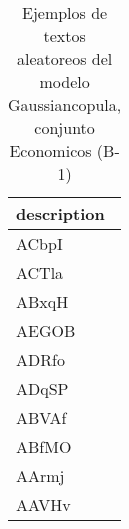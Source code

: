 \begin{table}[H]
\centering
\fontsize{8}{14}\selectfont
\caption{Ejemplos de textos aleatoreos del modelo Gaussiancopula, conjunto Economicos (B-1)}
\label{table-sample10-economicos-b-1-gaussiancopula-text}
\begin{tabular}{|m{50em}|}
\hline
\rowcolor[gray]{0.8}
description \\
\hline ACbpI \\
\hline ACTla \\
\hline ABxqH \\
\hline AEGOB \\
\hline ADRfo \\
\hline ADqSP \\
\hline ABVAf \\
\hline ABfMO \\
\hline AArmj \\
\hline AAVHv \\
\hline
\end{tabular}
\end{table}
